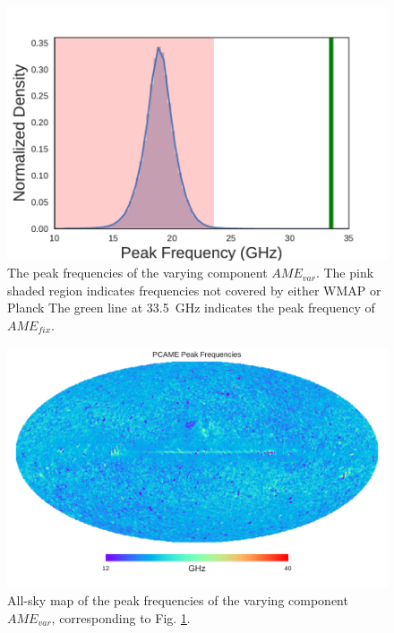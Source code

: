         \begin{figure}
          \includegraphics[width=\textwidth]{../Plots/ch_intro/AME_commander_freqdist.pdf}
          \centering
          \caption{The peak frequencies of the varying component $AME_{var}$.  The pink shaded region indicates frequencies not covered by either WMAP or Planck The green line at 33.5~GHz indicates the peak frequency of $AME_{fix}$.}
          \label{fig:AME_commander_freqdist}
        \end{figure}

        \begin{figure}
          \includegraphics[width=\textwidth]{../Plots/ch_datasources/PCAME_var_freq.pdf}
          \centering
          \caption{All-sky map of the peak frequencies of the varying component $AME_{var}$, corresponding to Fig. \ref{fig:AME_commander_freqdist}.}
          \label{fig:PCAME_var_freq}
        \end{figure}

